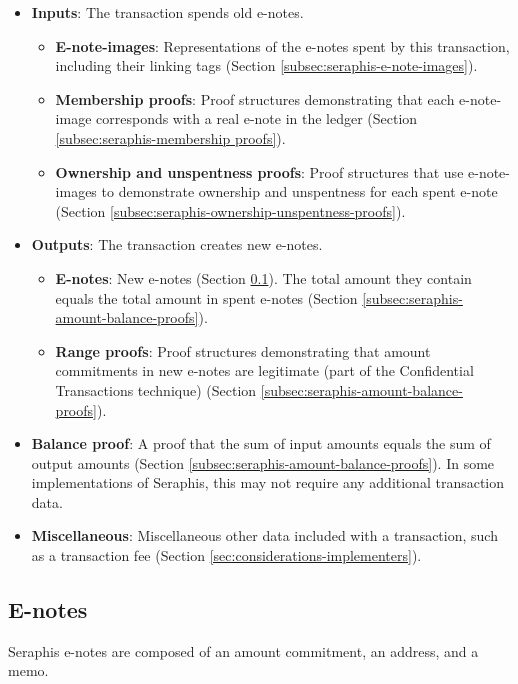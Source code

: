 \begin{itemize}
    \item \textbf{Inputs}: The transaction spends old e-notes.
    \begin{itemize}
        \item \textbf{E-note-images}: Representations of the e-notes spent by this transaction, including their linking tags (Section \ref{subsec:seraphis-e-note-images}).
        \item \textbf{Membership proofs}: Proof structures demonstrating that each e-note-image corresponds with a real e-note in the ledger (Section \ref{subsec:seraphis-membership proofs}).
        \item \textbf{Ownership and unspentness proofs}: Proof structures that use e-note-images to demonstrate ownership and unspentness for each spent e-note (Section \ref{subsec:seraphis-ownership-unspentness-proofs}).
    \end{itemize}
    \item \textbf{Outputs}: The transaction creates new e-notes.
    \begin{itemize}
        \item \textbf{E-notes}: New e-notes (Section \ref{subsec:seraphis-e-notes}). The total amount they contain equals the total amount in spent e-notes (Section \ref{subsec:seraphis-amount-balance-proofs}).
        \item \textbf{Range proofs}: Proof structures demonstrating that amount commitments in new e-notes are legitimate (part of the Confidential Transactions technique) (Section \ref{subsec:seraphis-amount-balance-proofs}).
    \end{itemize}
    \item \textbf{Balance proof}: A proof that the sum of input amounts equals the sum of output amounts (Section \ref{subsec:seraphis-amount-balance-proofs}). In some implementations of Seraphis, this may not require any additional transaction data.
    \item \textbf{Miscellaneous}: Miscellaneous other data included with a transaction, such as a transaction fee (Section \ref{sec:considerations-implementers}).
\end{itemize}


\subsection{E-notes}
\label{subsec:seraphis-e-notes}

Seraphis e-notes are composed of an amount commitment, an address, and a memo.

